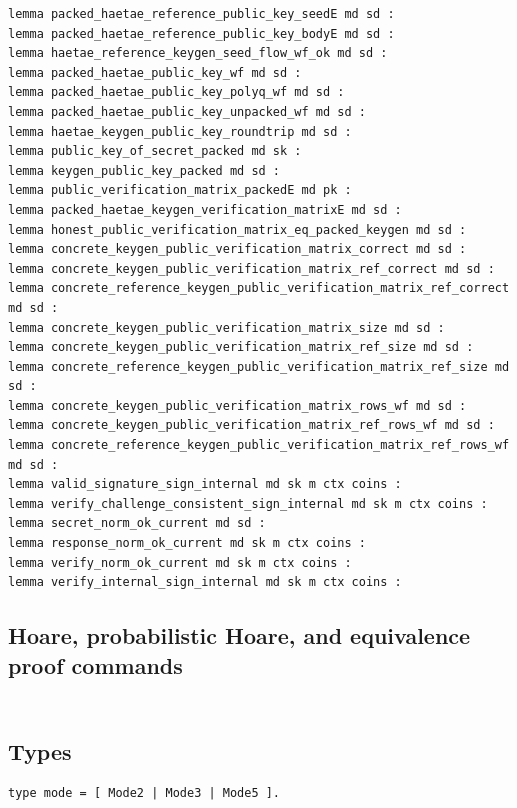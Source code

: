 \begin{lstlisting}[language=EasyCrypt,basicstyle=\ttfamily\tiny]
lemma packed_haetae_reference_public_key_seedE md sd :
lemma packed_haetae_reference_public_key_bodyE md sd :
lemma haetae_reference_keygen_seed_flow_wf_ok md sd :
lemma packed_haetae_public_key_wf md sd :
lemma packed_haetae_public_key_polyq_wf md sd :
lemma packed_haetae_public_key_unpacked_wf md sd :
lemma haetae_keygen_public_key_roundtrip md sd :
lemma public_key_of_secret_packed md sk :
lemma keygen_public_key_packed md sd :
lemma public_verification_matrix_packedE md pk :
lemma packed_haetae_keygen_verification_matrixE md sd :
lemma honest_public_verification_matrix_eq_packed_keygen md sd :
lemma concrete_keygen_public_verification_matrix_correct md sd :
lemma concrete_keygen_public_verification_matrix_ref_correct md sd :
lemma concrete_reference_keygen_public_verification_matrix_ref_correct md sd :
lemma concrete_keygen_public_verification_matrix_size md sd :
lemma concrete_keygen_public_verification_matrix_ref_size md sd :
lemma concrete_reference_keygen_public_verification_matrix_ref_size md sd :
lemma concrete_keygen_public_verification_matrix_rows_wf md sd :
lemma concrete_keygen_public_verification_matrix_ref_rows_wf md sd :
lemma concrete_reference_keygen_public_verification_matrix_ref_rows_wf md sd :
lemma valid_signature_sign_internal md sk m ctx coins :
lemma verify_challenge_consistent_sign_internal md sk m ctx coins :
lemma secret_norm_ok_current md sd :
lemma response_norm_ok_current md sk m ctx coins :
lemma verify_norm_ok_current md sk m ctx coins :
lemma verify_internal_sign_internal md sk m ctx coins :
\end{lstlisting}

\subsection*{Hoare, probabilistic Hoare, and equivalence proof commands}
\begin{lstlisting}[language=EasyCrypt,basicstyle=\ttfamily\tiny]
\end{lstlisting}

\section*{}

\subsection*{Types}
\begin{lstlisting}[language=EasyCrypt,basicstyle=\ttfamily\tiny]
type mode = [ Mode2 | Mode3 | Mode5 ].
\end{lstlisting}

